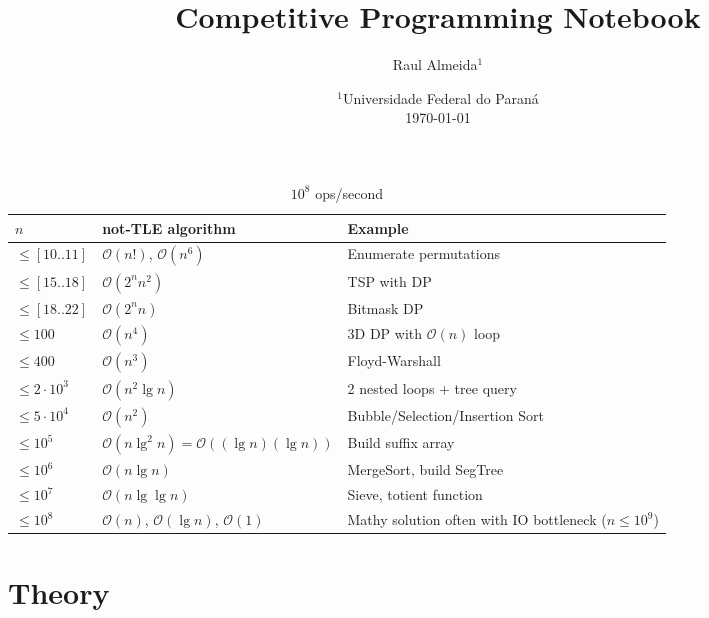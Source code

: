 \documentclass[a4paper]{article}
\title{Competitive Programming Notebook}
\author{Raul Almeida$^1$}
\date{$^1$Universidade Federal do Paraná\\[2ex]\today}
\newcommand{\bigO}{\mathcal{O}}
\begin{document}
\twocolumn
\maketitle

\tableofcontents
\begin{table*}
\centering
  \begin{tabular}{lll}
    \hline
    $n$ & not-TLE algorithm & Example \\ \hline
    $\leq [10..11]$ & $\bigO(n!)$, $\bigO(n^6)$ & Enumerate permutations \\
    $\leq [15..18]$ & $\bigO(2^n n^2)$ & TSP with DP \\
    $\leq [18..22]$ & $\bigO(2^n n)$ & Bitmask DP \\
    $\leq 100$ & $\bigO(n^4)$ & 3D DP with $\bigO(n)$ loop \\
    $\leq 400$ & $\bigO(n^3)$ & Floyd-Warshall \\
    $\leq 2\cdot 10^3$ & $\bigO(n^2 \lg n)$ & 2 nested loops + tree query \\
    $\leq 5\cdot 10^4$ & $\bigO(n^2)$ & Bubble/Selection/Insertion Sort \\
    $\leq 10^5$ & $\bigO(n \lg^2 n) = \bigO((\lg n)(\lg n))$ & Build suffix array \\
    $\leq 10^6$ & $\bigO(n \lg n)$ & MergeSort, build SegTree \\
    $\leq 10^7$ & $\bigO(n \lg \lg n)$ & Sieve, totient function \\
    $\leq 10^8$ & $\bigO(n)$, $\bigO(\lg n)$, $\bigO(1)$ & Mathy solution often with IO bottleneck ($n \leq 10^9$) \\
    \hline
  \end{tabular}
  \caption*{$10^8$ ops/second}
\end{table*}


\newpage
\section{Theory}
\end{document}
